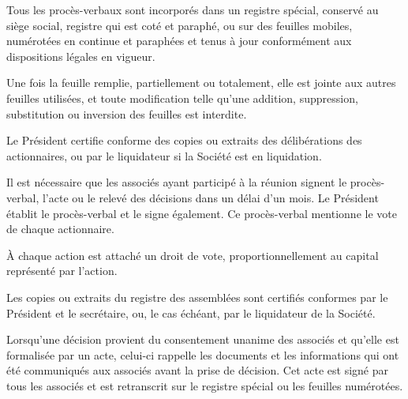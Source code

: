 \documentclass[a4paper,12pt]{report}
\begin{document}
Tous les procès-verbaux sont incorporés dans un registre spécial, conservé au siège social, registre qui est coté et paraphé, ou sur des feuilles mobiles, numérotées en continue et paraphées et tenus à jour conformément aux dispositions légales en vigueur.

Une fois la feuille remplie, partiellement ou totalement, elle est jointe aux autres feuilles utilisées, et toute modification telle qu'une addition, suppression, substitution ou inversion des feuilles est interdite.

Le Président certifie conforme des copies ou extraits des délibérations des actionnaires, ou par le liquidateur si la Société est en liquidation.

Il est nécessaire que les associés ayant participé à la réunion signent le procès-verbal, l'acte ou le relevé des décisions dans un délai d'un mois. Le Président établit le procès-verbal et le signe également. Ce procès-verbal mentionne le vote de chaque actionnaire.

À chaque action est attaché un droit de vote, proportionnellement au capital représenté par l'action.

Les copies ou extraits du registre des assemblées sont certifiés conformes par le Président et le secrétaire, ou, le cas échéant, par le liquidateur de la Société.

Lorsqu'une décision provient du consentement unanime des associés et qu'elle est formalisée par un acte, celui-ci rappelle les documents et les informations qui ont été communiqués aux associés avant la prise de décision. Cet acte est signé par tous les associés et est retranscrit sur le registre spécial ou les feuilles numérotées.

%
%
\end{document}
